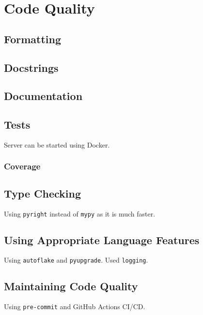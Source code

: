 \documentclass{prettytex/ox/mmsc-special-topic}
\begin{document}
  \section{Code Quality}
  \subsection{Formatting}
  \subsection{Docstrings}
  \subsection{Documentation}
  \subsection{Tests}
  Server can be started using Docker.

  \subsubsection{Coverage}
  \subsection{Type Checking}
  Using \texttt{pyright} instead of \texttt{mypy} as it is much faster.
  \subsection{Using Appropriate Language Features}
  Using \texttt{autoflake} and \texttt{pyupgrade}.
  Used \texttt{logging}.
  \subsection{Maintaining Code Quality}
  Using \texttt{pre-commit} and GitHub Actions CI/CD.
\end{document}
